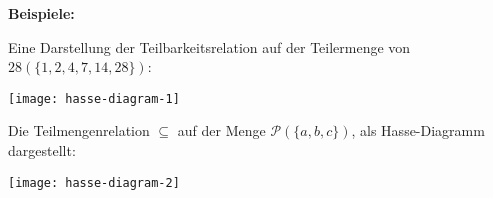 \textbf{Beispiele:}

\begin{multicols}{2}
    Eine Darstellung der Teilbarkeitsrelation auf der Teilermenge von $28 (\{1,2,4,7,14,28\})$:
    \vspace{-\topsep}
    \begin{center}
        \texttt{[image: hasse-diagram-1]}
    \end{center}

    Die Teilmengenrelation $\subseteq$ auf der Menge $\mathcal{P}(\{a,b,c\})$, als Hasse-Diagramm dargestellt:
    \vspace{-\topsep}
    \begin{center}
        \texttt{[image: hasse-diagram-2]}
    \end{center}
\end{multicols}